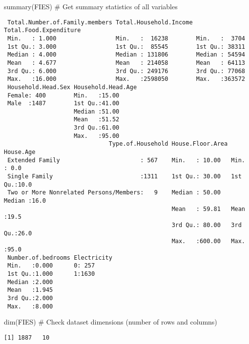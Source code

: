 \documentclass[
]{article}
\newenvironment{Shaded}{\begin{snugshade}}{\end{snugshade}}
\newcommand{\CommentTok}[1]{\textcolor[rgb]{0.37,0.37,0.37}{#1}}
\newcommand{\FunctionTok}[1]{\textcolor[rgb]{0.28,0.35,0.67}{#1}}
\newcommand{\NormalTok}[1]{\textcolor[rgb]{0.00,0.23,0.31}{#1}}
\begin{document}
\begin{Shaded}
\begin{Highlighting}[]
\FunctionTok{summary}\NormalTok{(FIES) }\CommentTok{\# Get summary statistics of all variables  }
\end{Highlighting}
\end{Shaded}

\begin{verbatim}
 Total.Number.of.Family.members Total.Household.Income Total.Food.Expenditure
 Min.   : 1.000                 Min.   :  16238        Min.   :  3704        
 1st Qu.: 3.000                 1st Qu.:  85545        1st Qu.: 38311        
 Median : 4.000                 Median : 131806        Median : 54594        
 Mean   : 4.677                 Mean   : 214058        Mean   : 64113        
 3rd Qu.: 6.000                 3rd Qu.: 249176        3rd Qu.: 77068        
 Max.   :16.000                 Max.   :2598050        Max.   :363572        
 Household.Head.Sex Household.Head.Age
 Female: 400        Min.   :15.00     
 Male  :1487        1st Qu.:41.00     
                    Median :51.00     
                    Mean   :51.52     
                    3rd Qu.:61.00     
                    Max.   :95.00     
                              Type.of.Household House.Floor.Area   House.Age   
 Extended Family                       : 567    Min.   : 10.00   Min.   : 0.0  
 Single Family                         :1311    1st Qu.: 30.00   1st Qu.:10.0  
 Two or More Nonrelated Persons/Members:   9    Median : 50.00   Median :16.0  
                                                Mean   : 59.81   Mean   :19.5  
                                                3rd Qu.: 80.00   3rd Qu.:26.0  
                                                Max.   :600.00   Max.   :95.0  
 Number.of.bedrooms Electricity
 Min.   :0.000      0: 257     
 1st Qu.:1.000      1:1630     
 Median :2.000                 
 Mean   :1.945                 
 3rd Qu.:2.000                 
 Max.   :8.000                 
\end{verbatim}

\begin{Shaded}
\begin{Highlighting}[]
\FunctionTok{dim}\NormalTok{(FIES) }\CommentTok{\# Check dataset dimensions (number of rows and columns)}
\end{Highlighting}
\end{Shaded}

\begin{verbatim}
[1] 1887   10
\end{verbatim}
\end{document}
